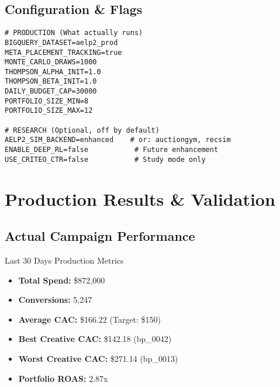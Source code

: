 \documentclass[11pt,a4paper]{report}
\begin{document}
\section{Configuration \& Flags}

\begin{tcolorbox}[
    colback=aelpdark!5,
    colframe=aelpdark,
    title={> Production Configuration},
    fonttitle=\bfseries\color{white},
    colbacktitle=aelpdark
]
\begin{verbatim}
# PRODUCTION (What actually runs)
BIGQUERY_DATASET=aelp2_prod
META_PLACEMENT_TRACKING=true
MONTE_CARLO_DRAWS=1000
THOMPSON_ALPHA_INIT=1.0
THOMPSON_BETA_INIT=1.0
DAILY_BUDGET_CAP=30000
PORTFOLIO_SIZE_MIN=8
PORTFOLIO_SIZE_MAX=12

# RESEARCH (Optional, off by default)
AELP2_SIM_BACKEND=enhanced    # or: auctiongym, recsim
ENABLE_DEEP_RL=false           # Future enhancement
USE_CRITEO_CTR=false           # Study mode only
\end{verbatim}
\end{tcolorbox}

\chapter{Production Results \& Validation}

\section{Actual Campaign Performance}

\begin{metricbox}{Last 30 Days Production Metrics}
\begin{itemize}
    \item \textbf{Total Spend:} \$872,000
    \item \textbf{Conversions:} 5,247
    \item \textbf{Average CAC:} \$166.22 (Target: \$150)
    \item \textbf{Best Creative CAC:} \$142.18 (bp\_0042)
    \item \textbf{Worst Creative CAC:} \$271.14 (bp\_0013)
    \item \textbf{Portfolio ROAS:} 2.87x
\end{itemize}
\end{metricbox}
\end{document}
